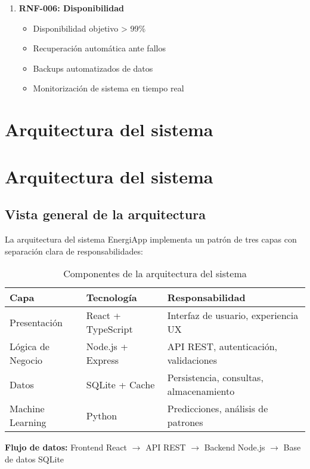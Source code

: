 \begin{enumerate}
    \item \textbf{RNF-006: Disponibilidad}
    \begin{itemize}
        \item Disponibilidad objetivo > 99\%
        \item Recuperación automática ante fallos
        \item Backups automatizados de datos
        \item Monitorización de sistema en tiempo real
    \end{itemize}
\end{enumerate}

\section{Arquitectura del sistema}

\section{Arquitectura del sistema}

\subsection{Vista general de la arquitectura}

La arquitectura del sistema EnergiApp implementa un patrón de tres capas con separación clara de responsabilidades:

\begin{table}[H]
\centering
\caption{Componentes de la arquitectura del sistema}
\begin{tabular}{|l|l|l|}
\hline
\textbf{Capa} & \textbf{Tecnología} & \textbf{Responsabilidad} \\
\hline
Presentación & React + TypeScript & Interfaz de usuario, experiencia UX \\
\hline
Lógica de Negocio & Node.js + Express & API REST, autenticación, validaciones \\
\hline
Datos & SQLite + Cache & Persistencia, consultas, almacenamiento \\
\hline
Machine Learning & Python & Predicciones, análisis de patrones \\
\hline
\end{tabular}
\label{tab:arquitectura_componentes}
\end{table}

\textbf{Flujo de datos:}
Frontend React $\rightarrow$ API REST $\rightarrow$ Backend Node.js $\rightarrow$ Base de datos SQLite

